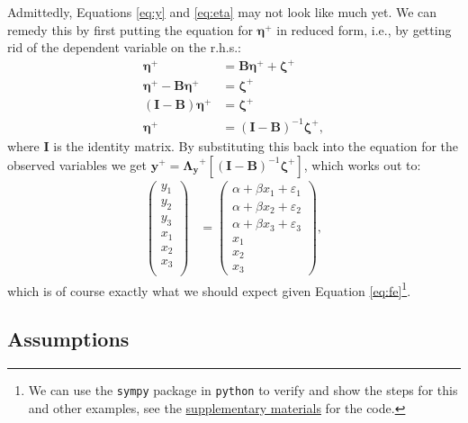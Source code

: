 \documentclass[
  12pt,
  a4paper]{article}
\begin{document}
Admittedly, Equations \eqref{eq:y} and \eqref{eq:eta} may not look like
much yet. We can remedy this by first putting the equation for
\(\bm{\eta}^{+}\) in reduced form, i.e., by getting rid of the dependent
variable on the r.h.s.: \begin{align}
\bm{\eta}^{+} & = \bm{B}\bm{\eta}^{+} + \bm{\zeta}^{+} \\
\bm{\eta}^{+} - \bm{B}\bm{\eta}^{+} & = \bm{\zeta}^{+} \\
(\bm{I} - \bm{B})\bm{\eta}^{+} & = \bm{\zeta}^{+} \\
\bm{\eta}^{+} & = (\bm{I} - \bm{B})^{-1}\bm{\zeta}^{+},
\end{align} where \(\bm{I}\) is the identity matrix. By substituting
this back into the equation for the observed variables we get
\(\bm{y}^{+} = \bm{\Lambda_{y}}^{+}[(\bm{I} - \bm{B})^{-1}\bm{\zeta}^{+}]\),
which works out to: \begin{align}
\begin{pmatrix} 
y_{1} \\
y_{2} \\
y_{3} \\
x_{1} \\
x_{2} \\
x_{3} \\
\end{pmatrix} & = 
\begin{pmatrix}
\alpha + \beta x_{1} + \varepsilon_{1} \\
\alpha + \beta x_{2} + \varepsilon_{2} \\
\alpha + \beta x_{3} + \varepsilon_{3} \\
x_{1} \\
x_{2} \\
x_{3}
\end{pmatrix},
\end{align} which is of course exactly what we should expect given
Equation \eqref{eq:fe}\footnote{We can use the \texttt{sympy} package in
  \texttt{python} to verify and show the steps for this and other
  examples, see the
  \href{https://github.com/henrik-andersen/FE-SEM/blob/master/sympy-doublecheck-matrixnotation.py}{supplementary
  materials} for the code.}.

\hypertarget{assumptions}{%
\subsection{Assumptions}\label{assumptions}}
\end{document}
